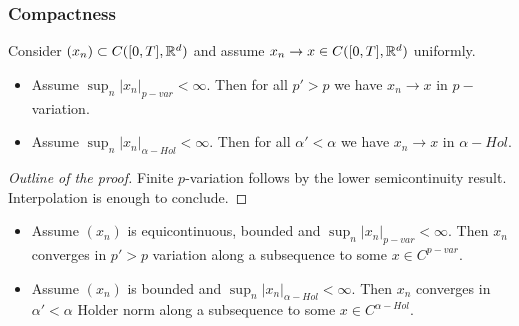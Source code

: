 \subsubsection{Compactness}

\begin{lemma}
    Consider $(x_n) \subset C([0,T], \mathbb{R}^d)$ and assume $x_n \rightarrow x \in C([0,T], \mathbb{R}^d)$ uniformly.
    \begin{itemize}
        \item Assume $\sup_n |x_n|_{p-var} < \infty.$ Then for all $p' > p$ we have $x_n \rightarrow x$ in $p-$variation.
        \item Assume $\sup_n |x_n|_{\alpha-Hol} < \infty.$ Then for all $\alpha' < \alpha$ we have $x_n \rightarrow x$ in $\alpha-Hol$.
    \end{itemize}
\end{lemma}
\begin{proof}[Outline of the proof]
    Finite $p$-variation follows by the lower semicontinuity result. Interpolation is enough to conclude.
\end{proof}

\begin{proposition}[Compactness]
    \begin{itemize}
        \item Assume $(x_n)$ is equicontinuous, bounded and $\sup_n |x_n|_{p-var} < \infty.$
        Then $x_n$ converges in $p' > p$ variation along a subsequence to some $x \in C^{p-var}.$
        \item Assume $(x_n)$ is bounded and $\sup_n |x_n|_{\alpha-Hol} < \infty.$
        Then $x_n$ converges in $\alpha' < \alpha$ Holder norm along a subsequence to some $x \in C^{\alpha-Hol}.$
    \end{itemize}
\end{proposition}

